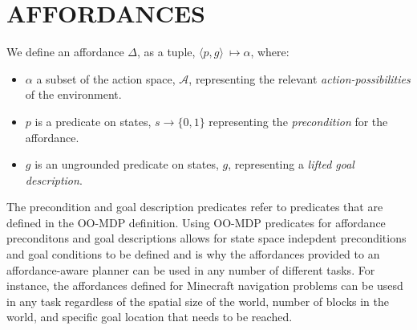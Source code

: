 \documentclass[]{article}
\begin{document}



\section{AFFORDANCES}
\label{sec:affordances}

We define an affordance $\Delta$, 
as a tuple, $\langle p,g\rangle\ \longmapsto \alpha$,
where:
\begin{itemize}
\item[] $\alpha$ a subset of the action space, $\mathcal{A}$, representing the relevant {\it action-possibilities} of the environment.
\item[] $p$ is a predicate on states, $s \longrightarrow \{$0$, 1\}$
  representing the {\em precondition} for the affordance.
\item[] $g$ is an ungrounded predicate on states, $g$, representing a {\it lifted goal description}.
\end{itemize}
The precondition and goal description predicates refer to predicates that are defined in the OO-MDP definition. 
Using OO-MDP predicates for affordance preconditons and goal descriptions 
allows for state space indepdent preconditions and goal conditions 
to be defined and is why the affordances provided to an
affordance-aware planner can be used in any number of different tasks. For instance, the affordances defined for Minecraft navigation problems can be usesd in any task regardless of the spatial size of the world, number of blocks in the world, and specific goal location that needs to be reached.
\end{document}
